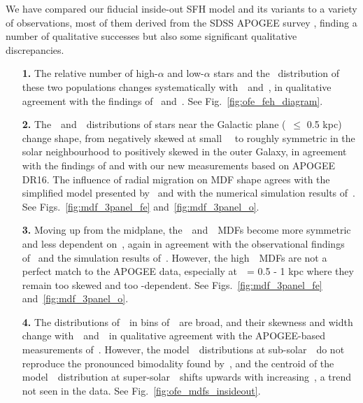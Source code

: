 \documentclass[draft2.tex]{subfiles}
\begin{document}
\par 
We have compared our fiducial inside-out SFH model and its variants to a 
variety of observations, most of them derived from the SDSS APOGEE survey 
\citep{Majewski2017}, finding a number of qualitative successes but also some 
significant qualitative discrepancies. 
\begin{enumerate} 

	\item[\textbf{1.}] The relative number of high-$\alpha$ and low-$\alpha$ 
	stars and the \feh~distribution of these two populations changes 
	systematically with~\rgal~and~\absz, in qualitative agreement with the 
	findings of~\citet{Nidever2014} and~\citet{Hayden2015}. 
	See Fig.~\ref{fig:ofe_feh_diagram}. 

	\item[\textbf{2.}] The~\feh~and~\oh~distributions of stars near the 
	Galactic plane (\absz~$\leq$ 0.5 kpc) change shape, from negatively skewed 
	at small~\rgal~ to roughly symmetric in the solar neighbourhood to 
	positively skewed in the outer Galaxy, in agreement with the findings of 
	\citet{Hayden2015} and with our new measurements based on APOGEE DR16. 
	The influence of radial migration on MDF shape agrees with the simplified 
	model presented by~\citet{Hayden2015} and with the numerical simulation 
	results of~\citet{Loebman2016}. 
	See Figs.~\ref{fig:mdf_3panel_fe} and~\ref{fig:mdf_3panel_o}. 

	\item[\textbf{3.}] Moving up from the midplane, the~\feh~and~\oh~MDFs 
	become more symmetric and less dependent on~\rgal, again in agreement with 
	the observational findings of~\citet{Hayden2015} and the simulation results 
	of~\citet{Loebman2016}. 
	However, the high~\absz~MDFs are not a perfect match to the APOGEE data, 
	especially at~\absz~= 0.5 - 1 kpc where they remain too skewed and too
	\rgal-dependent. 
	See Figs.~\ref{fig:mdf_3panel_fe} and~\ref{fig:mdf_3panel_o}. 

	\item[\textbf{4.}] The distributions of~\ofe~in bins of~\feh~are broad, and 
	their skewness and width change with~\rgal~and~\absz~in qualitative 
	agreement with the APOGEE-based measurements of~\citet{Vincenzo2021a}. 
	However, the model~\ofe~distributions at sub-solar~\feh~do not reproduce 
	the pronounced bimodality found by~\citet{Vincenzo2021a}, and the 
	centroid of the model~\ofe~distribution at super-solar~\feh~shifts upwards 
	with increasing~\absz, a trend not seen in the data. 
	See Fig.~\ref{fig:ofe_mdfs_insideout}. 


\end{enumerate}
\end{document}
